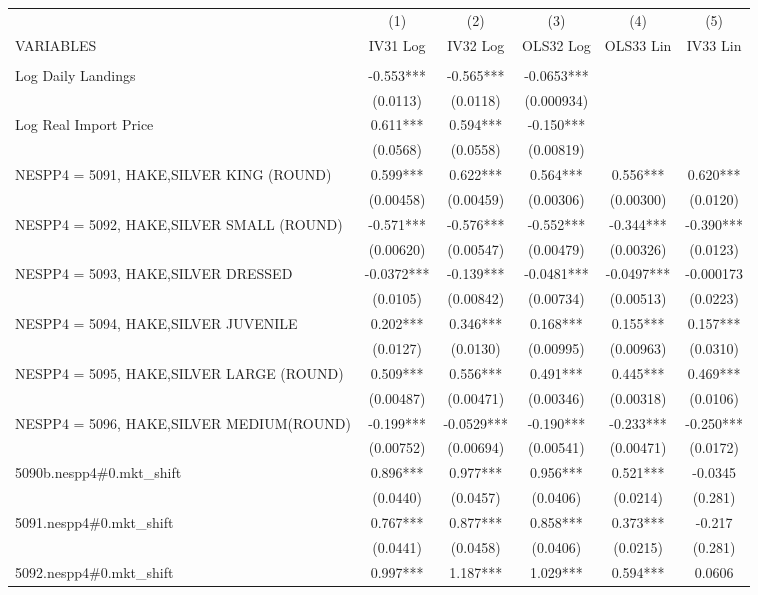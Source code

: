 \begin{tabular}{lccccc} \hline
 & (1) & (2) & (3) & (4) & (5) \\
VARIABLES & IV31 Log & IV32 Log & OLS32 Log & OLS33 Lin & IV33 Lin \\ \hline
 &  &  &  &  &  \\
Log Daily Landings & -0.553*** & -0.565*** & -0.0653*** &  &  \\
 & (0.0113) & (0.0118) & (0.000934) &  &  \\
Log Real Import Price & 0.611*** & 0.594*** & -0.150*** &  &  \\
 & (0.0568) & (0.0558) & (0.00819) &  &  \\
NESPP4 = 5091, HAKE,SILVER KING (ROUND) & 0.599*** & 0.622*** & 0.564*** & 0.556*** & 0.620*** \\
 & (0.00458) & (0.00459) & (0.00306) & (0.00300) & (0.0120) \\
NESPP4 = 5092, HAKE,SILVER SMALL (ROUND) & -0.571*** & -0.576*** & -0.552*** & -0.344*** & -0.390*** \\
 & (0.00620) & (0.00547) & (0.00479) & (0.00326) & (0.0123) \\
NESPP4 = 5093, HAKE,SILVER DRESSED & -0.0372*** & -0.139*** & -0.0481*** & -0.0497*** & -0.000173 \\
 & (0.0105) & (0.00842) & (0.00734) & (0.00513) & (0.0223) \\
NESPP4 = 5094, HAKE,SILVER JUVENILE & 0.202*** & 0.346*** & 0.168*** & 0.155*** & 0.157*** \\
 & (0.0127) & (0.0130) & (0.00995) & (0.00963) & (0.0310) \\
NESPP4 = 5095, HAKE,SILVER LARGE (ROUND) & 0.509*** & 0.556*** & 0.491*** & 0.445*** & 0.469*** \\
 & (0.00487) & (0.00471) & (0.00346) & (0.00318) & (0.0106) \\
NESPP4 = 5096, HAKE,SILVER MEDIUM(ROUND) & -0.199*** & -0.0529*** & -0.190*** & -0.233*** & -0.250*** \\
 & (0.00752) & (0.00694) & (0.00541) & (0.00471) & (0.0172) \\
5090b.nespp4\#0.mkt\_shift & 0.896*** & 0.977*** & 0.956*** & 0.521*** & -0.0345 \\
 & (0.0440) & (0.0457) & (0.0406) & (0.0214) & (0.281) \\
5091.nespp4\#0.mkt\_shift & 0.767*** & 0.877*** & 0.858*** & 0.373*** & -0.217 \\
 & (0.0441) & (0.0458) & (0.0406) & (0.0215) & (0.281) \\
5092.nespp4\#0.mkt\_shift & 0.997*** & 1.187*** & 1.029*** & 0.594*** & 0.0606 \\

\end{tabular}
